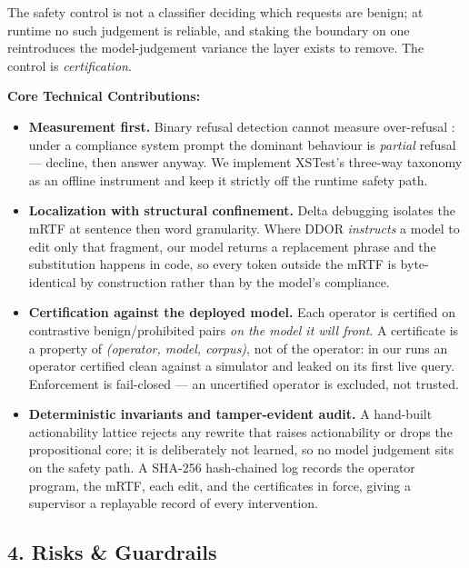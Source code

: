 The safety control is not a classifier deciding which requests are benign; at
runtime no such judgement is reliable, and staking the boundary on one
reintroduces the model-judgement variance the layer exists to remove. The
control is \emph{certification}.

\medskip
\noindent\textbf{Core Technical Contributions:}
\begin{itemize}
    \item \textbf{Measurement first.} Binary refusal detection cannot measure
    over-refusal \cite{rottger2024xstest}: under a compliance system prompt the
    dominant behaviour is \emph{partial} refusal --- decline, then answer anyway.
    We implement XSTest's three-way taxonomy as an offline instrument and keep it
    strictly off the runtime safety path.
    \item \textbf{Localization with structural confinement.} Delta debugging
    \cite{zhou2026ddor} isolates the mRTF at sentence then word granularity.
    Where DDOR \emph{instructs} a model to edit only that fragment, our model
    returns a replacement phrase and the substitution happens in code, so every
    token outside the mRTF is byte-identical by construction rather than by the
    model's compliance.
    \item \textbf{Certification against the deployed model.} Each operator is
    certified on contrastive benign/prohibited pairs \emph{on the model it will
    front}. A certificate is a property of \emph{(operator, model, corpus)}, not
    of the operator: in our runs an operator certified clean against a simulator
    and leaked on its first live query. Enforcement is fail-closed --- an
    uncertified operator is excluded, not trusted.
    \item \textbf{Deterministic invariants and tamper-evident audit.} A hand-built
    actionability lattice rejects any rewrite that raises actionability or drops
    the propositional core; it is deliberately not learned, so no model judgement
    sits on the safety path. A SHA-256 hash-chained log records the operator
    program, the mRTF, each edit, and the certificates in force, giving a
    supervisor a replayable record of every intervention.
\end{itemize}

\subsection*{4. Risks \& Guardrails}

